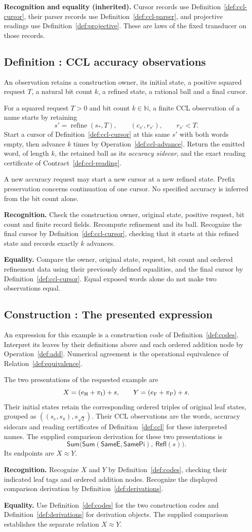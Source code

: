 \documentclass[11pt]{article}
\newcommand{\N}{\mathbb N}
\newcounter{definition}
\newcommand{\entry}[2]{%
  \refstepcounter{definition}\subsection*{#1 \thedefinition: #2}}
\newcommand{\definition}[1]{\entry{Definition}{#1}}
\newcommand{\construction}[1]{\entry{Construction}{#1}}
\newcommand{\refine}{\operatorname{refine}}
\newcommand{\checks}[2]{\begin{samepage}\par
  \textbf{Recognition.} #1\par\nopagebreak[4]
  \textbf{Equality.} #2\par\end{samepage}}
\newcommand{\inheritedchecks}[1]{\par
  \textbf{Recognition and equality (inherited).} #1\par}
\begin{document}
\inheritedchecks{Cursor records use Definition~\ref{def:ccl-cursor},
their parser records use Definition~\ref{def:ccl-parser}, and projective
readings use Definition~\ref{def:projective}. These are laws of the fixed
transducer on those records.}

\definition{CCL accuracy observations}\label{def:ccl}
An observation retains a construction owner, its initial state, a positive
squared request $T$, a natural bit count $k$, a refined state, a rational
ball and a final cursor.

For a squared request $T>0$ and bit count $k\in\N$, a finite CCL
observation of a name starts by retaining
\[
                  s'=\refine(s_*,T),\qquad
                  (c_{s'},r_{s'}),\qquad r_{s'}<T.
\]
Start a cursor of Definition~\ref{def:ccl-cursor} at this same $s'$ with
both words empty, then advance $k$ times by
Operation~\ref{def:ccl-advance}. Return the emitted word, of length $k$,
the retained ball as its \emph{accuracy sidecar}, and the exact reading
certificate of Contract~\ref{def:ccl-reading}.

A new accuracy request may start a new cursor at a new refined state.
Prefix preservation concerns continuation of one cursor. No specified
accuracy is inferred from the bit count alone.
\checks{Check the construction owner, original state, positive request,
bit count and finite record fields. Recompute refinement and its ball.
Recognize the final cursor by Definition~\ref{def:ccl-cursor}, checking
that it starts at this refined state and records exactly $k$ advances.}
{Compare the owner, original state, request, bit count and ordered
refinement data using their previously defined equalities, and the final
cursor by Definition~\ref{def:ccl-cursor}. Equal exposed words alone do
not make two observations equal.}

\construction{The presented expression}\label{def:expression}
An expression for this example is a construction code of
Definition~\ref{def:codes}. Interpret its leaves by their definitions above
and each ordered addition node by Operation~\ref{def:add}. Numerical
agreement is the operational equivalence of Relation~\ref{def:equivalence}.

The two presentations of the requested example are
\[
                  X=(e_{\rm H}+\pi_{\rm I})+s,\qquad
                  Y=(e_{\rm F}+\pi_{\rm P})+s.
\]
Their initial states retain the corresponding ordered triples of original
leaf states, grouped as $((s_e,s_\pi),s_{\sqrt2})$. Their CCL observations
are the words, accuracy sidecars and reading certificates of
Definition~\ref{def:ccl} for these interpreted names.
The supplied comparison derivation for these two presentations is
\[
 \mathsf{Sum}\bigl(
   \mathsf{Sum}(\mathsf{SameE},\mathsf{SamePi}),\
   \mathsf{Refl}(s)\bigr).
\]
Its endpoints are $X\approx Y$.
\checks{Recognize $X$ and $Y$ by Definition~\ref{def:codes}, checking
their indicated leaf tags and ordered addition nodes. Recognize the
displayed comparison derivation by Definition~\ref{def:derivations}.}
{Use Definition~\ref{def:codes} for the two construction codes and
Definition~\ref{def:derivations} for derivation objects. The supplied
comparison establishes the separate relation $X\approx Y$.}
\end{document}
